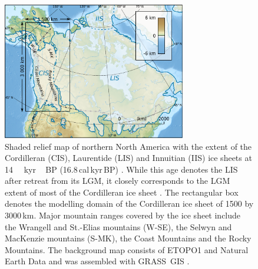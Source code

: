 \documentclass[tc, ms]{copernicus}
\begin{document}
\begin{figure}[t]
	\vspace*{2mm}
	\begin{center}
		\includegraphics[width=8cm]{cordillera-climate-locmap}
	\end{center}
	\caption{Shaded relief map of northern North America with the extent of the Cordilleran (CIS), Laurentide (LIS) and Innuitian (IIS) ice sheets at 14\,\unit{\,kyr\,BP} (16.8\,cal\,kyr\,BP) \citep{dyke-2004}. While this age denotes the LIS after retreat from its LGM, it closely corresponds to the LGM extent of most of the Cordilleran ice sheet \citep{porter-swanson-1998,dyke-2004,stroeven-etal-2010}. The rectangular box denotes the modelling domain of the Cordilleran ice sheet of 1500 by 3000\,km. Major mountain ranges covered by the ice sheet include the Wrangell and St.-Elias mountains (W-SE), the Selwyn and MacKenzie mountains (S-MK), the Coast Mountains and the Rocky Mountains. The background map consists of ETOPO1 \citep{data:etopo1} and Natural Earth Data \citep{data:naturalearth} and was assembled with GRASS~GIS \citep{soft:grass}.}
	\label{fig:locmap}
\end{figure}
\end{document}
